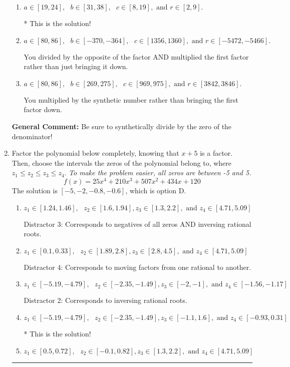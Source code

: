 \documentclass{extbook}[14pt]
\newcommand{\litem}[1]{\item #1

\rule{\textwidth}{0.4pt}}
\begin{document}
\begin{enumerate}
{\begin{enumerate}[label=\Alph*.]
 You divided by the opposite of the factor.
\item \( a \in [19, 24], \text{   } b \in [31, 38], \text{   } c \in [8, 19], \text{   and   } r \in [2, 9]. \)

* This is the solution!
\item \( a \in [80, 86], \text{   } b \in [-370, -364], \text{   } c \in [1356, 1360], \text{   and   } r \in [-5472, -5466]. \)

 You divided by the opposite of the factor AND multiplied the first factor rather than just bringing it down.
\item \( a \in [80, 86], \text{   } b \in [269, 275], \text{   } c \in [969, 975], \text{   and   } r \in [3842, 3846]. \)

 You multiplied by the synthetic number rather than bringing the first factor down.
\end{enumerate}

\textbf{General Comment:} Be sure to synthetically divide by the zero of the denominator!
}
\litem{
Factor the polynomial below completely, knowing that $x + 5$ is a factor. Then, choose the intervals the zeros of the polynomial belong to, where $z_1 \leq z_2 \leq z_3 \leq z_4$. \textit{To make the problem easier, all zeros are between -5 and 5.}
\[ f(x) = 25x^{4} +210 x^{3} +507 x^{2} +434 x + 120 \]The solution is \( [-5, -2, -0.8, -0.6] \), which is option D.\begin{enumerate}[label=\Alph*.]
\item \( z_1 \in [1.24, 1.46], \text{   }  z_2 \in [1.6, 1.94], z_3 \in [1.3, 2.2], \text{   and   } z_4 \in [4.71, 5.09] \)

 Distractor 3: Corresponds to negatives of all zeros AND inversing rational roots.
\item \( z_1 \in [0.1, 0.33], \text{   }  z_2 \in [1.89, 2.8], z_3 \in [2.8, 4.5], \text{   and   } z_4 \in [4.71, 5.09] \)

 Distractor 4: Corresponds to moving factors from one rational to another.
\item \( z_1 \in [-5.19, -4.79], \text{   }  z_2 \in [-2.35, -1.49], z_3 \in [-2, -1], \text{   and   } z_4 \in [-1.56, -1.17] \)

 Distractor 2: Corresponds to inversing rational roots.
\item \( z_1 \in [-5.19, -4.79], \text{   }  z_2 \in [-2.35, -1.49], z_3 \in [-1.1, 1.6], \text{   and   } z_4 \in [-0.93, 0.31] \)

* This is the solution!
\item \( z_1 \in [0.5, 0.72], \text{   }  z_2 \in [-0.1, 0.82], z_3 \in [1.3, 2.2], \text{   and   } z_4 \in [4.71, 5.09] \)


\end{enumerate}}
\end{enumerate}
\end{document}

